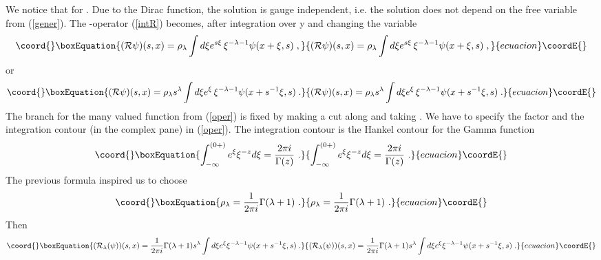 \documentclass[a4paper,11pt]{article}
\begin{document}
We notice that \coordHE{} for \coordHE{}. Due to the Dirac
function, the solution is gauge independent, i.e. the solution does not
depend on the free variable \myHighlight{$\xi $}\coordHE{} from (\ref{gener}). The \coordHE{}-operator (\ref {intR}) becomes, after integration over y and changing
the variable \coordHE{}
\begin{equation}\coord{}\boxEquation{
\label{ope}
({\cal R}\psi )(s,x)
     =\rho _{\lambda}\int d\xi e^{s\xi}\,\xi^{-\lambda -1}\psi(x+\xi,s)\;,
}{
({\cal R}\psi )(s,x)
     =\rho _{\lambda}\int d\xi e^{s\xi}\,\xi^{-\lambda -1}\psi(x+\xi,s)\;,
}{ecuacion}\coordE{}\end{equation}
 or
\begin{equation}\coord{}\boxEquation{
\label{oper}
({\cal R}\psi )(s,x)
     =\rho _{\lambda} s^{\lambda}\int d\xi e^{\xi}\,
      \xi ^{-\lambda -1}\psi(x+s^{-1}\xi,s)\;.
}{
({\cal R}\psi )(s,x)
     =\rho _{\lambda} s^{\lambda}\int d\xi e^{\xi}\,
      \xi ^{-\lambda -1}\psi(x+s^{-1}\xi,s)\;.
}{ecuacion}\coordE{}\end{equation}
The branch for the many valued function \coordHE{} from (\ref{oper}) is
fixed by making a cut along \coordHE{} and taking \coordHE{}. We have to specify the factor \myHighlight{$\rho _\lambda $}\coordHE{} and the
integration contour (in the complex \myHighlight{$\xi$}\coordHE{} pane) in (\ref{oper}). The
integration contour is the Hankel contour for the Gamma function
\cite{Olver}
\begin{equation}\coord{}\boxEquation{
\label{G}
\int_{-\infty}^{(0+)}e^{\xi} \xi^{-z}d\xi=\frac{2\pi i}{\Gamma(z)} ~.
}{
\int_{-\infty}^{(0+)}e^{\xi} \xi^{-z}d\xi=\frac{2\pi i}{\Gamma(z)} ~.
}{ecuacion}\coordE{}\end{equation}
The previous formula inspired us to choose
\begin{equation}\coord{}\boxEquation{
\label{ro}
\rho_\lambda=\frac{1}{2\pi i}\Gamma (\lambda +1) ~.
}{
\rho_\lambda=\frac{1}{2\pi i}\Gamma (\lambda +1) ~.
}{ecuacion}\coordE{}\end{equation}
Then
\begin{equation}\coord{}\boxEquation{
\label{oper_basis}
({\cal R}_\lambda(\psi))(s,x)
      =\frac{1}{2\pi i}\Gamma(\lambda +1)s^{\lambda}\int d\xi
      e^{\xi}\xi^{-\lambda -1}\psi(x+s^{-1}\xi,s)\;.
}{
({\cal R}_\lambda(\psi))(s,x)
      =\frac{1}{2\pi i}\Gamma(\lambda +1)s^{\lambda}\int d\xi
      e^{\xi}\xi^{-\lambda -1}\psi(x+s^{-1}\xi,s)\;.
}{ecuacion}\coordE{}\end{equation}
\end{document}
